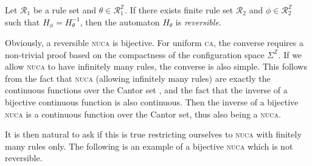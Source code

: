 \documentclass[runningheads]{llncs}
\newcommand{\Z}{\mathbb{Z}}
\newcommand{\R}{\mathcal{R}}
\begin{document}
\begin{definition}
Let $\R_1$ be a rule set and $\theta \in \R_1^\Z$. If there exists finite rule set $\R_2$ and $\phi \in \R_2^\Z$ such that $H_\phi = H_\theta^{-1}$, then the automaton $H_\theta$ is \emph{reversible}.
\end{definition}

Obviously, a reversible \textsc{nuca} is bijective. For uniform \textsc{ca}, the converse requires a non-trivial proof based on the compactness of the configuration space $\Sigma^\Z$. If we allow \textsc{nuca} to have infinitely many rules, the converse is also simple. This follows from the fact that \textsc{nuca} (allowing infinitely many rules) are exactly the continuous functions over the Cantor set \cite{dennuz}, and the fact that the inverse of a bijective continuous function is also continuous. Then the inverse of a bijective \textsc{nuca} is a continuous function over the Cantor set, thus also being a \textsc{nuca}.


It is then natural to ask if this is true restricting ourselves to \textsc{nuca} with finitely many rules only. The following is an example of a bijective \textsc{nuca} which is not reversible. 
\end{document}
